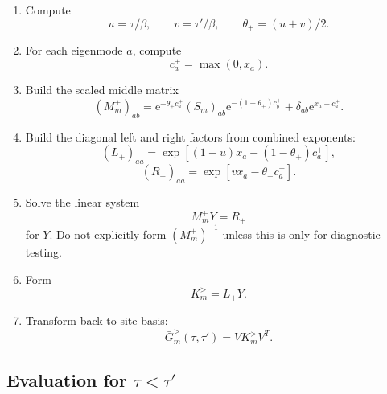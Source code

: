 \documentclass[11pt]{article}
\newcommand{\e}{\mathrm{e}}
\newcommand{\1}{\mathbb{1}}
\newcommand{\sq}[1]{\left[#1\right]}
\begin{document}
\begin{enumerate}[leftmargin=2em]
    \item Compute
    \[
        u=\tau/\beta,
        \qquad
        v=\tau'/\beta,
        \qquad
        \theta_+=(u+v)/2.
    \]

    \item For each eigenmode \(a\), compute
    \[
        c_a^+=\max(0,x_a).
    \]

    \item Build the scaled middle matrix
    \[
        (M_m^+)_{ab}
        =
        \e^{-\theta_+ c_a^+}
        (S_m)_{ab}
        \e^{-(1-\theta_+)c_b^+}
        +
        \delta_{ab}\e^{x_a-c_a^+}.
    \]

    \item Build the diagonal left and right factors from combined exponents:
    \[
        (L_+)_{aa}
        =
        \exp\sq{(1-u)x_a-(1-\theta_+)c_a^+},
    \]
    \[
        (R_+)_{aa}
        =
        \exp\sq{vx_a-\theta_+c_a^+}.
    \]

    \item Solve the linear system
    \[
        M_m^+Y=R_+
    \]
    for \(Y\).  Do not explicitly form \((M_m^+)^{-1}\) unless this is only
    for diagnostic testing.

    \item Form
    \[
        K_m^> = L_+Y.
    \]

    \item Transform back to site basis:
    \[
        \bar G_m^>(\tau,\tau')=VK_m^>V^T.
    \]
\end{enumerate}

\subsection*{Evaluation for \(\tau<\tau'\)}
\end{document}

